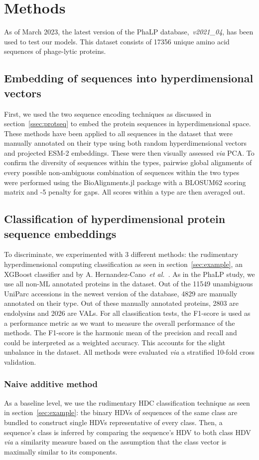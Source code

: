 \section{Methods}
As of March 2023, the latest version of the PhaLP database,~\textit{v2021\_04}, has been used to test our models. This dataset consists of 17356 unique amino acid sequences of phage-lytic proteins.
\subsection*{Embedding of sequences into hyperdimensional vectors}
First, we used the two sequence encoding techniques as discussed in section~\ref{ssec:protseq} to embed the protein sequences in hyperdimensional space. These methods have been applied to all sequences in the dataset that were manually annotated on their type using both random hyperdimensional vectors and projected ESM-2 embeddings. These were then visually assessed \textit{via} PCA. To confirm the diversity of sequences within the types, pairwise global alignments of every possible non-ambiguous combination of sequences within the two types were performed using the BioAlignments.jl package with a BLOSUM62 scoring matrix and -5 penalty for gaps. All scores within a type are then averaged out.

\subsection*{Classification of hyperdimensional protein sequence embeddings}
To discriminate, we experimented with 3 different methods: the rudimentary hyperdimensional computing classification as seen in section~\ref{sec:example}, an XGBoost classifier and  by A. Hernandez-Cano~\textit{et al.}~\cite{onlinehd}. As in the PhaLP study, we use all non-ML annotated proteins in the dataset. Out of the 11549 unambiguous UniParc accessions in the newest version of the database, 4829 are manually annotated on their type. Out of these manually annotated proteins, 2803 are endolysins and 2026 are VALs. For all classification tests, the F1-score is used as a performance metric as we want to measure the overall performance of the methods. The F1-score is the harmonic mean of the precision and recall and could be interpreted as a weighted accuracy. This accounts for the slight unbalance in the dataset. All methods were evaluated \textit{via} a stratified 10-fold cross validation.
\subsubsection*{Naive additive method}
As a baseline level, we use the rudimentary HDC classification technique as seen in section~\ref{sec:example}: the binary HDVs of sequences of the same class are bundled to construct single HDVs representative of every class. Then, a sequence's class is inferred by comparing the sequence's HDV to both class HDV \textit{via} a similarity measure based on the assumption that the class vector is maximally similar to its components.
